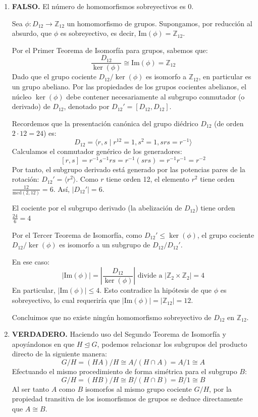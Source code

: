 \documentclass[12pt]{article}
\begin{document}
\begin{ejercicio}[1.0 punto]
\begin{enumerate}[label=\arabic*)]
            \item \textbf{FALSO.}
            El número de homomorfismos sobreyectivos es 0.

            Sea $\phi: D_{12} \to \mathbb{Z}_{12}$ un homomorfismo de grupos. Supongamos, por reducción al absurdo, que $\phi$ es sobreyectivo, es decir, $\text{Im}(\phi) = \mathbb{Z}_{12}$.

            Por el Primer Teorema de Isomorfía para grupos, sabemos que:
            \[
            \frac{D_{12}}{\ker(\phi)} \cong \text{Im}(\phi) = \mathbb{Z}_{12}
            \]
            Dado que el grupo cociente $D_{12}/\ker(\phi)$ es isomorfo a $\mathbb{Z}_{12}$, en particular es un grupo abeliano. Por las propiedades de los grupos cocientes abelianos, el núcleo $\ker(\phi)$ debe contener necesariamente al subgrupo conmutador (o derivado) de $D_{12}$, denotado por $D_{12}' = [D_{12}, D_{12}]$.

            Recordemos que la presentación canónica del grupo diédrico $D_{12}$ (de orden $2 \cdot 12 = 24$) es:
            \[
            D_{12} = \langle r, s \mid r^{12} = 1, s^2 = 1, srs = r^{-1} \rangle
            \]
            Calculamos el conmutador genérico de los generadores:
            \[
            [r, s] = r^{-1}s^{-1}rs = r^{-1}(srs) = r^{-1}r^{-1} = r^{-2}
            \]
            Por tanto, el subgrupo derivado está generado por las potencias pares de la rotación: $D_{12}' = \langle r^2 \rangle$. Como $r$ tiene orden 12, el elemento $r^2$ tiene orden $\frac{12}{\text{mcd}(2,12)} = 6$. Así, $|D_{12}'| = 6$.

            El cociente por el subgrupo derivado (la abelización de $D_{12}$) tiene orden $\frac{24}{6} = 4$

            Por el Tercer Teorema de Isomorfía, como $D_{12}' \le \ker(\phi)$, el grupo cociente $D_{12}/\ker(\phi)$ es isomorfo a un subgrupo de $D_{12}/D_{12}'$. 

            En ese caso:
            \[
            |\text{Im}(\phi)| = \left| \frac{D_{12}}{\ker(\phi)} \right| \text{ divide a } |\mathbb{Z}_2 \times \mathbb{Z}_2| = 4
            \]
            En particular, $|\text{Im}(\phi)| \le 4$. Esto contradice la hipótesis de que $\phi$ es sobreyectivo, lo cual requeriría que $|\text{Im}(\phi)| = |\mathbb{Z}_{12}| = 12$. 

            Concluimos que no existe ningún homomorfismo sobreyectivo de $D_{12}$ en $\mathbb{Z}_{12}$.

            \item \textbf{VERDADERO.} 
            Haciendo uso del Segundo Teorema de Isomorfía y apoyándonos en que $H \trianglelefteq G$, podemos relacionar los subgrupos del producto directo de la siguiente manera:
            \[ G/H = (HA)/H \cong A/(H \cap A) = A/1 \cong A \]
            Efectuando el mismo procedimiento de forma simétrica para el subgrupo $B$:
            \[ G/H = (HB)/H \cong B/(H \cap B) = B/1 \cong B \]
            Al ser tanto $A$ como $B$ isomorfos al mismo grupo cociente $G/H$, por la propiedad transitiva de los isomorfismos de grupos se deduce directamente que $A \cong B$.
            

\end{enumerate}
\end{ejercicio}
\end{document}
